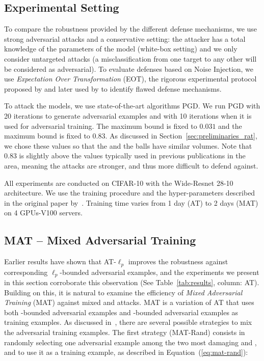 \subsection{Experimental Setting}
\label{sec:experimental_settings}

To compare the robustness provided by the different defense mechanisms, we use strong adversarial attacks and a conservative setting: the attacker has a total knowledge of the parameters of the model (white-box setting) and we only consider untargeted attacks  (a misclassification from one target to any other will be considered as adversarial). To evaluate defenses based on Noise Injection, we use {\em Expectation Over Transformation} (EOT), the rigorous experimental protocol  proposed by \cite{athalye2017synthesizing} and later used by \cite{athalye2018obfuscated,carlini2019evaluating} to identify flawed defense mechanisms. 

To attack the models, we use state-of-the-art algorithms PGD. We run PGD with 20 iterations to generate adversarial examples and with 10 iterations when it is used for adversarial training. The maximum \linf bound is fixed to $0.031$ and the maximum \ltwo bound is fixed to $0.83$. As discussed in Section~\ref{sec:preliminaries_rat}, we chose these values so that the \linf and the \ltwo balls have similar volumes. Note that $0.83$ is slightly above the values typically used in previous publications in the area, meaning the attacks are stronger, and thus  more difficult to defend against.

All experiments are conducted on CIFAR-10 with the Wide-Resnet 28-10 architecture. We use the training procedure and the hyper-parameters described in the original paper by~\cite{ZagoruykoK16}. Training time varies from 1 day (AT) to 2 days (MAT) on 4 GPUs-V100 servers. 


\subsection{MAT -- Mixed Adversarial Training}\label{subsec:mixed_adversarial_training}
Earlier results have shown that AT-$\ell_p$ improves the robustness against corresponding $\ell_p$-bounded adversarial examples, and the experiments we present in this section corroborate this observation (See Table~\ref{tab:results}, column: AT). Building on this, it is natural to examine the efficiency of \emph{Mixed Adversarial Training} (MAT) against mixed \linf and \ltwo attacks. MAT is a variation of AT that uses both \linf-bounded adversarial examples and \ltwo-bounded adversarial examples as training examples. As discussed in~\cite{tramer2019adversarial}, there are several possible strategies to mix the adversarial training examples. The first strategy (MAT-Rand) consists in randomly selecting one adversarial example among the two most damaging \linf and \ltwo, and to use it as a training example, as described in Equation~(\ref{eq:mat-rand}): 
